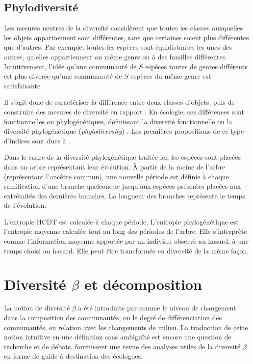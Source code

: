 \documentclass[a4paper]{article}
\begin{document}
\subsection{Phylodiversité}

Les mesures neutres de la diversité considèrent que toutes les classes auxquelles les objets appartiennent sont différentes, sans que certaines soient plus différentes que d'autres.
Par exemple, toutes les espèces sont équidistantes les unes des autres, qu'elles appartiennent au même genre ou à des familles différentes.
Intuitivement, l'idée qu'une communauté de $S$ espèces toutes de genres différents est plus diverse qu'une communauté de $S$ espèces du même genre est satisfaisante.


Il s'agit donc de caractériser la différence entre deux classes d'objets, puis de construire des mesures de diversité en rapport \citep{Pielou1975, May1990a, Cousins1991}.
En écologie, ces différences sont fonctionnelles ou phylogénétiques, définissant la diversité fonctionnelle \citep{Tilman1997} ou la diversité phylogénétique (\foreignlanguage{english}{\emph{phylodiversity}}) \citep{Webb2006}.
Les premières propositions de ce type d'indices sont dues à \cite{Rao1982}.

Dans le cadre de la diversité phylogénétique traitée ici, les espèces sont placées dans un arbre représentant leur évolution.
À partir de la racine de l'arbre (représentant l'ancêtre commun), une nouvelle période est définie à chaque ramification d'une branche quelconque jusqu'aux espèces présentes placées aux extrêmités des dernières branches.
La longueur des branches représente le temps de l'évolution.

L'entropie HCDT est calculée à chaque période.
L'entropie phylogénétique \citep{Marcon2014a} est l'entropie moyenne calculée tout au long des périodes de l'arbre.
Elle s'interprète comme l'information moyenne apportée par un individu observé au hasard, à une temps choisi au hasard.
Elle peut être transformée en diversité de la même façon.


\section[Diversité beta et décomposition]{Diversité $\beta$ et décomposition}

La notion de diversité $\beta$ a été introduite par \cite[][page 320]{Whittaker1960} comme le niveau de changement dans la composition des communautés, ou le degré de différenciation des communautés, en relation avec les changements de milieu. 
La traduction de cette notion intuitive en une définition sans ambiguïté est encore une question de recherche et de débats. 
\cite{Anderson2011} fournissent une revue des analyses utiles de la diversité $\beta$ en forme de guide à destination des écologues.
\end{document}
